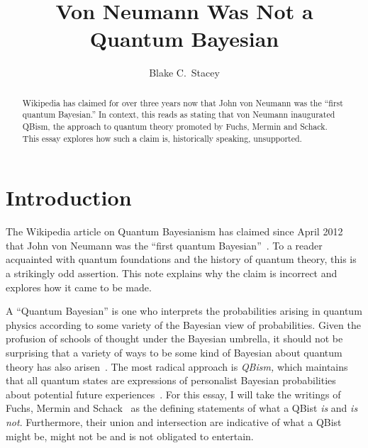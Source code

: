 \documentclass[aps,pra,superscriptaddress,12pt,tightenlines,nofootinbib]{revtex4-2}
\begin{document}
\title{Von Neumann Was Not a Quantum Bayesian}

\author{Blake C.\ Stacey}


\begin{abstract}
Wikipedia has claimed for over three years now that John von Neumann
was the ``first quantum Bayesian.''  In context, this reads as stating
that von Neumann inaugurated QBism, the approach to quantum theory
promoted by Fuchs, Mermin and Schack.  This essay explores how such a
claim is, historically speaking, unsupported.
\end{abstract}

\maketitle

\section{Introduction}

The Wikipedia article on Quantum Bayesianism has claimed since April
2012 that John von Neumann was the ``first quantum
Bayesian''~\cite{Wikipedia2012}.  To a reader acquainted with quantum
foundations and the history of quantum theory, this is a strikingly
odd assertion.  This note explains why the claim is incorrect and
explores how it came to be made.

A ``Quantum Bayesian'' is one who interprets the probabilities arising
in quantum physics according to some variety of the Bayesian view of
probabilities.  Given the profusion of schools of thought under the
Bayesian umbrella, it should not be surprising that a variety of ways
to be some kind of Bayesian about quantum theory has also
arisen~\cite{Baez2003, Barnum2010, Bub2015, Caticha2007,
  Coecke2012, GellMannHartle2012, Goyal2008, Leifer2006, Leifer2013,
  Pitowsky2003, PortaMana2007, Rau2009, Srednicki2005,
  Warmuth2009}.  The most radical approach is
\emph{QBism,} which maintains that all quantum states are expressions
of personalist Bayesian probabilities about potential future
experiences~\cite{Barnum2010, FuchsPerimeter, FuchsSchack2011,
  Timpson, MerminPT, RMP, AJP, Mermin14, Fuchs2014, Fuchs2014b,
  Stacey2014, Mermin14b, Mermin-Vienna, Mermin-Bell}.  For this essay,
I will take the writings of Fuchs, Mermin and
Schack~\cite{FuchsPerimeter, FuchsSchack2011, RMP, AJP, Fuchs2014,
  Fuchs2014b, MerminPT, Mermin14, Mermin14b, Mermin-Vienna,
  Mermin-Bell} as the defining statements of what a QBist \emph{is}
and \emph{is not}.  Furthermore, their union and intersection are
indicative of what a QBist might be, might not be and is not obligated
to entertain.
\end{document}
